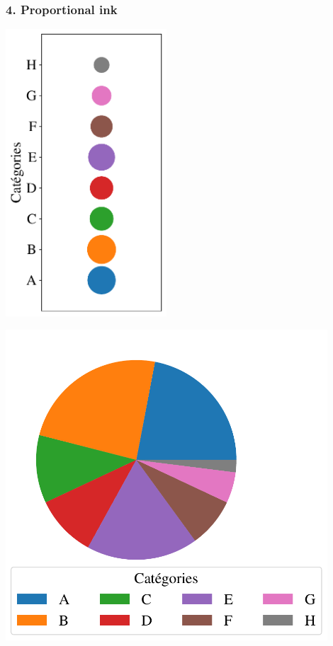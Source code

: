 \documentclass[sans,14pt]{beamer}
\begin{document}
{\begin{frame}
  \frametitle{4. Proportional ink}
  \begin{minipage}[h]{0.49\linewidth}
    \begin{center}
      \includegraphics[width=0.45\textwidth]{../poly/figures/pratiques/areas_bubbles}
    \end{center}
  \end{minipage}%
  \hfill
  \pause
  \begin{minipage}[h]{0.49\linewidth}
    \begin{center}
      \includegraphics[width=0.9\textwidth]{../poly/figures/pratiques/areas_pie}

\end{center}
\end{minipage}
\end{frame}}
\end{document}
